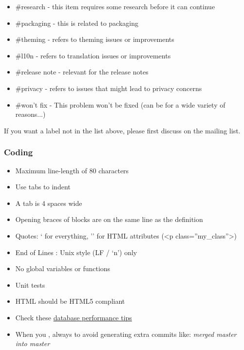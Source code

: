 \documentclass[letterpaper,10pt,english]{sphinxmanual}
\begin{document}
\begin{itemize}
\item {} 
\#research - this item requires some research before it can continue

\item {} 
\#packaging - this is related to packaging

\item {} 
\#theming - refers to theming issues or improvements

\item {} 
\#l10n - refers to translation issues or improvements

\item {} 
\#release note - relevant for the release notes

\item {} 
\#privacy - refers to issues that might lead to privacy concerns

\item {} 
\#won't fix - This problem won't be fixed (can be for a wide variety of reasons...)

\end{itemize}

If you want a label not in the list above, please first discuss on the mailing list.


\subsubsection{Coding}
\label{general/codingguidelines:coding}\begin{itemize}
\item {} 
Maximum line-length of 80 characters

\item {} 
Use tabs to indent

\item {} 
A tab is 4 spaces wide

\item {} 
Opening braces of blocks are on the same line as the definition

\item {} 
Quotes: ` for everything, '' for HTML attributes (\textless{}p class=''my\_class''\textgreater{})

\item {} 
End of Lines : Unix style (LF / `n') only

\item {} 
No global variables or functions

\item {} 
Unit tests

\item {} 
HTML should be HTML5 compliant

\item {} 
Check these \href{https://mailman.owncloud.org/pipermail/devel/2014-June/000262.html}{database performance tips}

\item {} 
When you , always  to avoid generating extra commits like: \emph{merged master into master}

\end{itemize}
\end{document}
